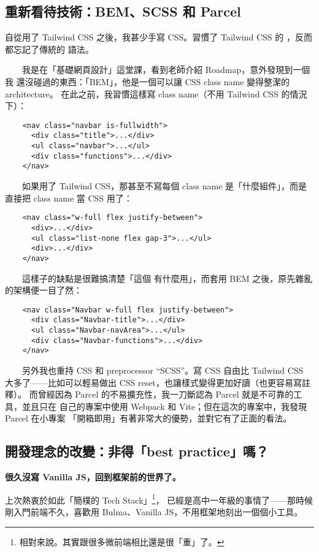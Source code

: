 \documentclass[12pt]{article}
\begin{document}
  \subsection{重新看待技術：BEM、SCSS 和 Parcel}
  自從用了 Tailwind CSS 之後，我甚少手寫 CSS。習慣了 Tailwind CSS 的
  ，反而都忘記了傳統的  語法。

  　　我是在「基礎網頁設計」這堂課，看到老師介紹 Roadmap，意外發現到一個我
  還沒碰過的東西：「BEM」，他是一個可以讓 CSS class name 變得整潔的 architecture。
  在此之前，我習慣這樣寫 class name（不用 Tailwind CSS 的情況下）：

  \begin{verbatim}
    <nav class="navbar is-fullwidth">
      <div class="title">...</div>
      <ul class="navbar">...</ul>
      <div class="functions">...</div>
    </nav>
  \end{verbatim}

  　　如果用了 Tailwind CSS，那甚至不寫每個 class name 是「什麼組件」，而是
  直接把 class name 當 CSS 用了：

  \begin{verbatim}
    <nav class="w-full flex justify-between">
      <div>...</div>
      <ul class="list-none flex gap-3">...</ul>
      <div>...</div>
    </nav>
  \end{verbatim}

  　　這樣子的缺點是很難搞清楚「這個  有什麼用」，而套用 BEM
  之後，原先雜亂的架構便一目了然：

  \begin{verbatim}
    <nav class="Navbar w-full flex justify-between">
      <div class="Navbar-title">...</div>
      <ul class="Navbar-navArea">...</ul>
      <div class="Navbar-functions">...</div>
    </nav>
  \end{verbatim}

  　　另外我也重持 CSS 和 preprocessor “SCSS”。寫 CSS 自由比 Tailwind CSS
  大多了——比如可以輕易做出 CSS reset，也讓樣式變得更加好讀（也更容易寫註釋）。
  而曾經因為 Parcel 的不易擴充性，我一刀斷認為 Parcel 就是不可靠的工具，並且只在
  自己的專案中使用 Webpack 和 Vite；但在這次的專案中，我發現 Parcel 在小專案
  「開箱即用」有著非常大的優勢，並對它有了正面的看法。

  \subsection{開發理念的改變：非得「best practice」嗎？}
  \begin{center}
    \textbf{很久沒寫 Vanilla JS，回到框架前的世界了。}
  \end{center}
  上次熱衷於如此「簡樸的 Tech Stack」\footnote{相對來說。其實跟很多微前端相比還是很「重」了。}，
  已經是高中一年級的事情了——那時候剛入門前端不久，喜歡用 Bulma、Vanilla JS，不用框架地刻出一個個小工具。
\end{document}
